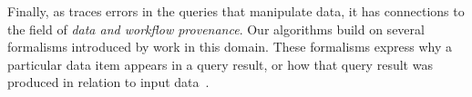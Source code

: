 Finally, as \sys traces errors in the queries that manipulate data, it
has connections to the field of \emph{data and workflow provenance}.
Our algorithms build on several formalisms introduced by work in this
domain. These formalisms express why a particular data item appears in
a query result, or how that query result was produced in relation to
input data~\cite{BunemanKT01,GKT07-semirings, CheneyCT09, CuiWW00
}.
 

